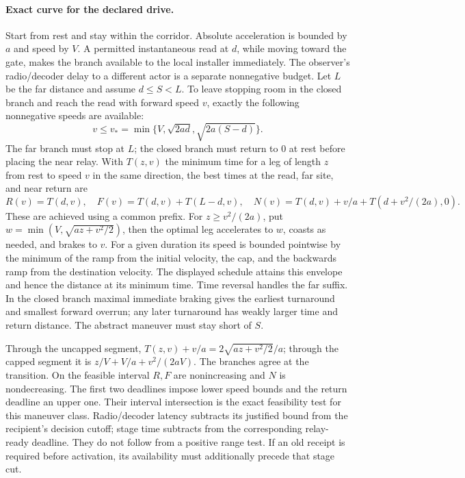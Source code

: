 \documentclass{article}
\begin{document}
\paragraph{Exact curve for the declared drive.}
Start from rest and stay within the corridor. Absolute
acceleration is bounded by \(a\) and speed by \(V\). A permitted
instantaneous read at \(d\), while moving toward the gate,
makes the branch available to the local installer immediately.
The observer's radio/decoder delay to a different actor is a
separate nonnegative budget. Let \(L\) be the far distance
and assume \(d\le S<L\). To leave stopping room in the closed
branch and reach the read with forward speed \(v\), exactly
the following nonnegative speeds are available:
\[
v\le v_*=\min\{V,\sqrt{2ad},\sqrt{2a(S-d)}\}.
\]
The far branch must stop at \(L\); the closed branch must
return to 0 at rest before placing the near relay.
With \(T(z,v)\) the minimum time for a leg of length \(z\)
from rest to speed \(v\) in the same direction, the best
times at the read, far site, and near return are
\[
R(v)=T(d,v),\quad
F(v)=T(d,v)+T(L-d,v),\quad
N(v)=T(d,v)+v/a+T(d+v^2/(2a),0).
\]
These are achieved using a common prefix.
For \(z\ge v^2/(2a)\), put
\(w=\min(V,\sqrt{az+v^2/2})\), then the optimal leg
accelerates to \(w\), coasts as needed, and brakes to \(v\).
For a given duration its speed is bounded pointwise
by the minimum of the ramp from the initial velocity, the cap,
and the backwards ramp from the destination velocity.
The displayed schedule attains this envelope and hence the
distance at its minimum time. Time reversal handles the far
suffix. In the closed branch maximal immediate braking
gives the earliest turnaround and smallest forward overrun;
any later turnaround has weakly larger time and return
distance. The abstract maneuver must stay short of \(S\).

Through the uncapped segment, \(T(z,v)+v/a=2\sqrt{az+v^2/2}/a\);
through the capped segment it is \(z/V+V/a+v^2/(2aV)\).
The branches agree at the transition. On the feasible interval
\(R,F\) are nonincreasing and \(N\) is nondecreasing.
The first two deadlines impose lower speed bounds and
the return deadline an upper one. Their interval intersection
is the exact feasibility test for this maneuver class.
Radio/decoder latency subtracts its justified bound from the
recipient's decision cutoff; stage time subtracts from the
corresponding relay-ready deadline. They do not follow from a
positive range test. If an old receipt is required before
activation, its availability must additionally precede that
stage cut.
\end{document}

